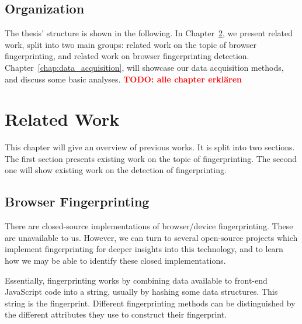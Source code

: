 \documentclass[
    fontsize=12pt,
    headings=small,
    parskip=half,
    bibliography=totoc,
    numbers=noenddot,
    open=any
    ]{scrreprt}
\newcommand{\todo}[1]{\textcolor{red}{\textbf{TODO: #1}}}
\begin{document}
\section{Organization}
The thesis' structure is shown in the following.
In Chapter~\ref{chap:related_work}, we present related work, split into two main groups:
related work on the topic of browser fingerprinting, and related work on
browser fingerprinting detection.
Chapter~\ref{chap:data_acquisition}, will showcase our data acquisition
methods, and discuss some basic analyses.
\todo{alle chapter erklären}




\chapter{Related Work}
\label{chap:related_work}
This chapter will give an overview of previous works. It is split into two sections.
The first section presents existing work on the topic of fingerprinting. The second one will show existing work on
the detection of fingerprinting.

\section{Browser Fingerprinting}
There are closed-source implementations of browser/device fingerprinting. These are unavailable to us.
However, we can turn to several open-source projects which implement fingerprinting for deeper insights into this technology,
and to learn how we may be able to identify these closed implementations.

Essentially, fingerprinting works by combining data available to front-end JavaScript code into a string,
usually by hashing some data structures. This string is the fingerprint.
Different fingerprinting methods can be distinguished by the different attributes they use to construct their fingerprint.
\end{document}
